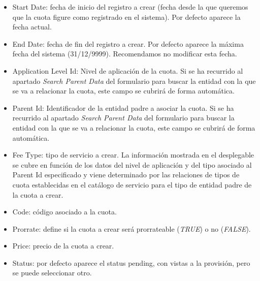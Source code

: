 \begin{itemize}
	\item Start Date: fecha de inicio del registro a crear (fecha desde la que queremos que la cuota figure como registrado en el sistema). Por defecto aparece la fecha actual.
	\item End Date: fecha de fin del registro a crear. Por defecto aparece la máxima fecha del sistema (31/12/9999). Recomendamos no modificar esta fecha.
	\item Application Level Id: Nivel de aplicación de la cuota. Si se ha recurrido al apartado \emph{Search Parent Data} del formulario para buscar la entidad con la que se va a relacionar la cuota, este campo se cubrirá de forma automática. 
	\item Parent Id: Identificador de la entidad padre a asociar la cuota. Si se ha recurrido al apartado \emph{Search Parent Data} del formulario para buscar la entidad con la que se va a relacionar la cuota, este campo se cubrirá de forma automática. 
	\item Fee Type: tipo de servicio a crear. La información mostrada en el desplegable se cubre en función de los datos del nivel de aplicación y del tipo asociado al Parent Id especificado y viene determinado por las relaciones de tipos de cuota establecidas en el catálogo de servicio para el tipo de entidad padre de la cuota a crear.
	\item Code: código asociado a la cuota.
	\item Prorrate: define si la cuota a crear será prorrateable (\textit{TRUE}) o no (\textit{FALSE}).
	\item Price: precio de la cuota a crear.
	\item Status: por defecto aparece el status pending, con vistas a la provisión, pero se puede seleccionar otro.
\end{itemize}



